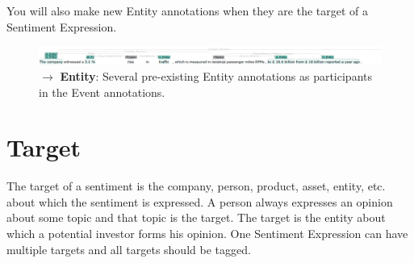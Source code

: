 You will also make new Entity annotations when they are the target of a Sentiment Expression.

\begin{figure}[h]
    \centering
    \includegraphics[width=\textwidth]{img/aal00s03 entities example.png}
    \caption*{$\rightarrow$ \textbf{Entity}: Several \entitycolor pre-existing Entity annotations as participants in the Event annotations.}
    \label{fig:my_label}
\end{figure}

\section{Target}
\label{sec:targetdefinition}
The target of a sentiment is the company, person, product, asset, entity, etc. about which the sentiment is expressed.
A person always expresses an opinion about some topic and that topic is the target.
The target is the entity about which a potential investor forms his opinion.
One Sentiment Expression can have multiple targets and all targets should be tagged.

